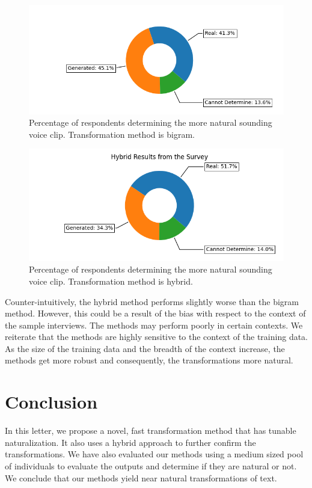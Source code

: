 \documentclass[journal]{IEEEtran}
\begin{document}
\begin{figure}
\centerline{\includegraphics[width=\columnwidth]{bigram.png}}
\caption{Percentage of respondents determining the more natural sounding voice clip. Transformation method is bigram.}
\label{fig1}
\end{figure}

\begin{figure}
\centerline{\includegraphics[width=\columnwidth]{hybrid.png}}
\caption{Percentage of respondents determining the more natural sounding voice clip. Transformation method is hybrid.}
\label{fig2}
\end{figure}

Counter-intuitively, the hybrid method performs slightly worse than the bigram method. However, this could be a result of the bias with respect to the context of the sample interviews. The methods may perform poorly in certain contexts. We reiterate that the methods are highly sensitive to the context of the training data. As the size of the training data and the breadth of the context increase, the methods get more robust and consequently, the transformations more natural. 

\section{Conclusion}

In this letter, we propose a novel, fast transformation method that has tunable naturalization. It also uses a hybrid approach to further confirm the transformations. We have also evaluated our methods using a medium sized pool of individuals to evaluate the outputs and determine if they are natural or not. We conclude that our methods yield near natural transformations of text.
\end{document}
